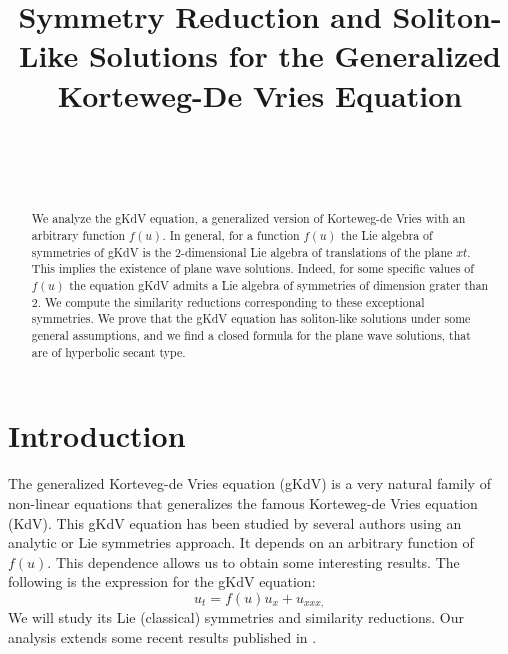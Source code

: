\documentclass[
11pt,%
tightenlines,%
twoside,%
onecolumn,%
nofloats,%
nobibnotes,%
nofootinbib,%
superscriptaddress,%
noshowpacs,%
centertags]%
{revtex4}
\begin{document}

\title{Symmetry Reduction and Soliton-Like Solutions for the Generalized Korteweg-De Vries Equation}

\author{~}


\author{~}




\begin{abstract}
We analyze the gKdV equation, a generalized version of Korteweg-de Vries with an arbitrary function $f(u)$. In general, for a function $f(u)$ the Lie algebra of symmetries of gKdV is the $2$-dimensional Lie algebra of translations of the plane $xt$. This implies the existence of plane wave solutions. 
Indeed, for some specific values of $f(u)$ the equation gKdV admits a Lie algebra of symmetries of dimension grater than $2$. We compute the similarity reductions corresponding to these exceptional symmetries. We prove that the gKdV equation has soliton-like solutions under some general assumptions, and we find a closed formula for the plane wave solutions, that are of hyperbolic secant type.
\end{abstract}


\maketitle

\section{Introduction}

The generalized Korteveg-de Vries equation (gKdV) is a very natural family of non-linear equations that generalizes the famous  Korteweg-de Vries equation (KdV). This gKdV equation has been studied by several authors using an analytic \cite{Kenig1989} or Lie symmetries \cite{Gungor2004, Bracken2005, Motlatsi2014} approach. It depends on an arbitrary function of $f(u)$. This dependence allows us to obtain some interesting results. The following is the expression for the gKdV equation:
\begin{equation}\label{gKdV}
u_t = f(u)u_{x} + u_{xxx,}
\end{equation}
We will study its Lie (classical) symmetries and similarity reductions. Our analysis extends some recent results published in \cite{Motlatsi2014}.
\end{document}
